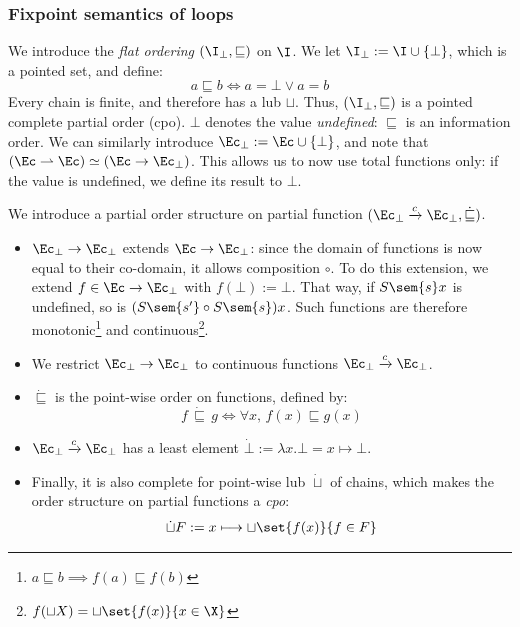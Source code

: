 \documentclass[toc, titlepaged]{../cs-classes/cs-classes}
\begin{document}
\subsubsection{Fixpoint semantics of loops} 
\begin{definition}
    We introduce the \emph{flat ordering} $(\I_\bot, \sqsubseteq)$ on $\I$. We let $\I_\bot := \I\cup\{\bot\}$, which is a pointed set, and define:
    \begin{equation*}
        a\sqsubseteq b \iff a = \bot \lor a=b
    \end{equation*}
    Every chain is finite, and therefore has a lub $\sqcup$. Thus, $(\I_\bot, \sqsubseteq)$ is a pointed complete partial order (cpo). 
    $\bot$ denotes the value \emph{undefined}: $\sqsubseteq$ is an information order. We can similarly introduce $\Ec_\bot := \Ec\cup\{\bot\}$, and note that $(\Ec\rightharpoonup\Ec) \simeq (\Ec\rightarrow\Ec_\bot)$. This allows us to now use total functions only: if the value is undefined, we define its result to $\bot$.
\end{definition}

\begin{definition}
    We introduce a partial order structure on partial function $(\Ec_\bot\xrightarrow{c}\Ec_\bot, \dot{\sqsubseteq})$.
    \begin{itemize}
        \item $\Ec_\bot\rightarrow\Ec_\bot$ extends $\Ec\rightarrow\Ec_\bot$: since the domain of functions is now equal to their co-domain, it allows composition $\circ$. To do this extension, we extend $f\in\Ec\rightarrow\Ec_\bot$ with $f(\bot):=\bot$. That way, if $S\sem{s}x$ is undefined, so is $(S\sem{s'}\circ S\sem{s})x$. Such functions are therefore monotonic\footnote{$a\sqsubseteq b\implies f(a)\sqsubseteq f(b)$} and continuous\footnote{$f(\sqcup X)=\sqcup\set{f(x)}{x\in\X}$}.
        \item We restrict $\Ec_\bot\rightarrow\Ec_\bot$ to continuous functions $\Ec_\bot\xrightarrow{c}\Ec_\bot$.
        \item $\dot{\sqsubseteq}$ is the point-wise order on functions, defined by:
        \begin{equation*}
            f\,\dot{\sqsubseteq}\,g \iff \forall x, \, f(x)\sqsubseteq g(x)
        \end{equation*}
        \item $\Ec_\bot\xrightarrow{c}\Ec_\bot$ has a least element $\dot{\bot} := \lambda x.\bot = x \mapsto \bot$.
        \item Finally, it is also complete for point-wise lub $\dot{\sqcup}$ of chains, which makes the order structure on partial functions a \emph{cpo}:
        \begin{equation*}
            \dot{\sqcup}F := x \longmapsto \sqcup\set{f(x)}{f\in F}
        \end{equation*}
    \end{itemize}
\end{definition}
\end{document}
